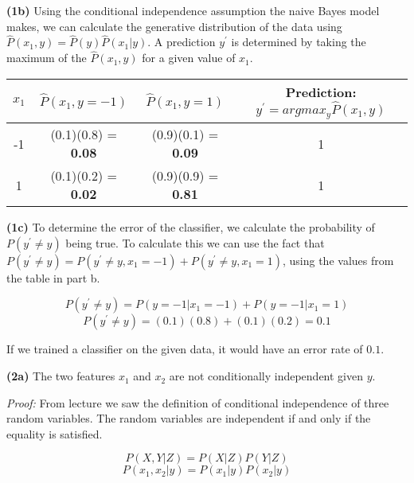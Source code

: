 \documentclass[11pt]{article}
\renewcommand\part[1]{\vspace{.10in}\textbf{(#1)}}
\begin{document}
\part{1b} Using the conditional independence assumption the naive Bayes model makes, we can calculate the generative distribution of the data using $\hat P(x_1, y) = \hat P(y) \hat P(x_1 | y)$. A prediction $y^\prime$ is determined by taking the maximum of the $\hat P(x_1, y)$ for a given value of $x_1$.

\begin{table}[H]
\centering
{\renewcommand{\arraystretch}{1.2}%
\begin{tabular}{| c | c | c | c |}
\hline
$x_1$ & $\hat P(x_1, y = -1)$ & $\hat P(x_1, y = 1)$ & \textbf{Prediction:} $y^\prime = argmax_y \hat P(x_1, y)$\\
\hline
-1 & (0.1)(0.8) = \textbf{0.08} & (0.9)(0.1) = \textbf{0.09} & 1\\ \hline
1 & (0.1)(0.2) = \textbf{0.02} & (0.9)(0.9) = \textbf{0.81} & 1\\ \hline
\end{tabular}}
\end{table}

\part{1c} To determine the error of the classifier, we calculate the probability of $P(y^\prime \neq y)$ being true. To calculate this we can use the fact that $P(y^\prime \neq y) = P(y^\prime \neq y, x_1 = -1) + P(y^\prime \neq y, x_1 = 1)$, using the values from the table in part b.

$$P(y^\prime \neq y) = P(y = -1 | x_1 = -1) + P(y = -1 | x_1 = 1)$$
$$P(y^\prime \neq y) = (0.1)(0.8) + (0.1)(0.2) = 0.1$$

If we trained a classifier on the given data, it would have an error rate of $0.1$.

\part{2a} The two features $x_1$ and $x_2$ are not conditionally independent given $y$.

\textit{Proof:} From lecture we saw the definition of conditional independence of three random variables. The random variables are independent if and only if the equality is satisfied.

$$P(X, Y|Z) = P(X|Z)P(Y|Z)$$
$$P(x_1, x_2|y) = P(x_1|y)P(x_2|y)$$
\end{document}
